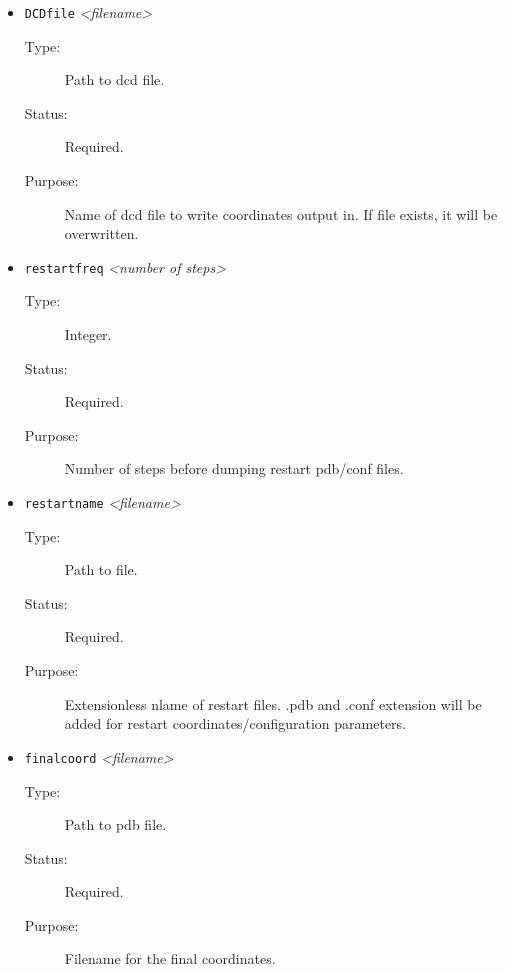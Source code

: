 \documentclass[a4paper]{article}
\begin{document}
\begin{itemize}
\item \texttt{DCDfile} \textit{\textless filename\textgreater}
\begin{description}
\item[Type:] Path to dcd file.
\item[Status:] Required.
\item[Purpose:] Name of dcd file to write coordinates output in. If file exists, it will be overwritten.
\end{description}

\item \texttt{restartfreq} \textit{\textless number of steps\textgreater}
\begin{description}
\item[Type:] Integer.
\item[Status:] Required.
\item[Purpose:] Number of steps before dumping restart pdb/conf files.
\end{description}

\item \texttt{restartname} \textit{\textless filename\textgreater}
\begin{description}
\item[Type:] Path to file.
\item[Status:] Required.
\item[Purpose:] Extensionless nlame of restart files. .pdb and .conf extension will be added for restart coordinates/configuration parameters.
\end{description}

\item \texttt{finalcoord} \textit{\textless filename\textgreater}
\begin{description}
\item[Type:] Path to pdb file.
\item[Status:] Required.
\item[Purpose:] Filename for the final coordinates.
\end{description}

\end{itemize}
   
\end{document}
